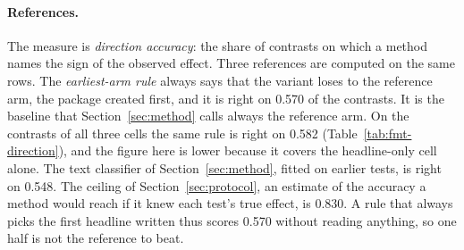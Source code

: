 \paragraph{References.} The measure is \emph{direction accuracy}: the share of contrasts on which a method names the sign of the observed effect. Three references are computed on the same rows. The \emph{earliest-arm rule} always says that the variant loses to the reference arm, the package created first, and it is right on 0.570 of the contrasts. It is the baseline that Section~\ref{sec:method} calls always the reference arm. On the contrasts of all three cells the same rule is right on 0.582 (Table~\ref{tab:fmt-direction}), and the figure here is lower because it covers the headline-only cell alone. The text classifier of Section~\ref{sec:method}, fitted on earlier tests, is right on 0.548. The ceiling of Section~\ref{sec:protocol}, an estimate of the accuracy a method would reach if it knew each test's true effect, is 0.830. A rule that always picks the first headline written thus scores 0.570 without reading anything, so one half is not the reference to beat.


